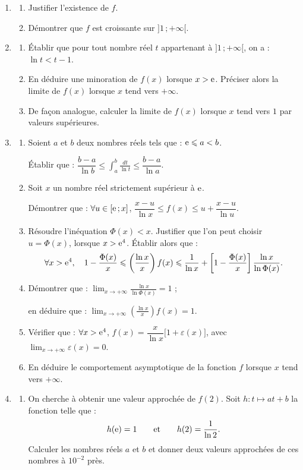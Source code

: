 \begin{enumerate}
	\item
	\begin{enumerate}
		\item Justifier l'existence de $f$.
		\item Démontrer que $f$ est croissante sur $]1\,;+\infty[$.
	\end{enumerate}
	\item
	\begin{enumerate}
		\item Établir que pour tout nombre réel $t$ appartenant à $]1\,;+\infty[$, on a : $\ln t < t-1$.
		\item En déduire une minoration de $f(x)$ lorsque $x>\mathrm{e}$. Préciser alors la limite de $f(x)$ lorsque $x$ tend vers $+\infty$.
		\item De façon analogue, calculer la limite de $f(x)$ lorsque $x$ tend vers $1$ par valeurs supérieures.
	\end{enumerate}
	\item
	\begin{enumerate}
		\item Soient $a$ et $b$ deux nombres réels tels que : $\mathrm{e}\leqslant a<b$.

		Établir que : $\dfrac{b-a}{\ln b} \leqslant \displaystyle\int_a^b \frac{dt}{\ln t} \leqslant \dfrac{b-a}{\ln a}$.
		\item Soit $x$ un nombre réel strictement supérieur à $\mathrm{e}$.

		Démontrer que : $\forall u\in[\mathrm{e}\,;x]$, $\dfrac{x-u}{\ln x} \leqslant f(x) \leqslant u + \dfrac{x-u}{\ln u}$.
		\item Résoudre l'inéquation $\Phi(x)<x$. Justifier que l'on peut choisir $u=\Phi(x)$, lorsque $x>\mathrm{e}^4$. Établir alors que :
		\[
		\forall x>\mathrm{e}^4, \quad 1-\frac{\Phi(x)}{x} \leqslant \left(\frac{\ln x}{x}\right)f(x) \leqslant \frac{1}{\ln x} + \left[1-\frac{\Phi(x)}{x}\right]\frac{\ln x}{\ln\Phi(x)}.
		\]
		\item Démontrer que : $\displaystyle\lim_{x\to+\infty} \frac{\ln x}{\ln\Phi(x)}= 1$ ;

		en déduire que : $\displaystyle\lim_{x\to+\infty} \left(\frac{\ln x}{x}\right)f(x) = 1$.
		\item Vérifier que : $\forall x>\mathrm{e}^4$, $f(x)=\dfrac{x}{\ln x}\bigl[1+\varepsilon(x)\bigr]$, avec $\displaystyle\lim_{x\to+\infty} \varepsilon(x)=0$.
		\item En déduire le comportement asymptotique de la fonction $f$ lorsque $x$ tend vers $+\infty$.
	\end{enumerate}
	\item
	\begin{enumerate}
		\item On cherche à obtenir une valeur approchée de $f(2)$. Soit $h : t\mapsto at+b$ la fonction telle que :
		\[
		h(\mathrm{e}) = 1 \qquad \text{et} \qquad h(2) = \frac{1}{\ln2}.
		\]
		Calculer les nombres réels $a$ et $b$ et donner deux valeurs approchées de ces nombres à $10^{-2}$ près.


\end{enumerate}
\end{enumerate}
